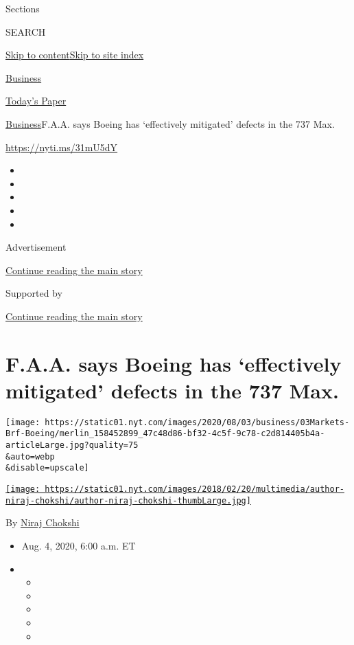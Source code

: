 Sections

SEARCH

\protect\hyperlink{site-content}{Skip to
content}\protect\hyperlink{site-index}{Skip to site index}

\href{https://www.nytimes.com/section/business}{Business}

\href{https://myaccount.nytimes.com/auth/login?response_type=cookie\&client_id=vi}{}

\href{https://www.nytimes.com/section/todayspaper}{Today's Paper}

\href{/section/business}{Business}\textbar{}F.A.A. says Boeing has
`effectively mitigated' defects in the 737 Max.

\url{https://nyti.ms/31mU5dY}

\begin{itemize}
\item
\item
\item
\item
\item
\end{itemize}

Advertisement

\protect\hyperlink{after-top}{Continue reading the main story}

Supported by

\protect\hyperlink{after-sponsor}{Continue reading the main story}

\hypertarget{faa-says-boeing-has-effectively-mitigated-defects-in-the-737-max}{%
\section{F.A.A. says Boeing has `effectively mitigated' defects in the
737
Max.}\label{faa-says-boeing-has-effectively-mitigated-defects-in-the-737-max}}

\texttt{[image: https://static01.nyt.com/images/2020/08/03/business/03Markets-Brf-Boeing/merlin\_158452899\_47c48d86-bf32-4c5f-9c78-c2d814405b4a-articleLarge.jpg?quality=75\\\&auto=webp\\\&disable=upscale]}

\href{https://www.nytimes.com/by/niraj-chokshi}{\texttt{[image: https://static01.nyt.com/images/2018/02/20/multimedia/author-niraj-chokshi/author-niraj-chokshi-thumbLarge.jpg]}}

By \href{https://www.nytimes.com/by/niraj-chokshi}{Niraj Chokshi}

\begin{itemize}
\item
  Aug. 4, 2020, 6:00 a.m. ET
\item
  \begin{itemize}
  \item
  \item
  \item
  \item
  \item
  \end{itemize}
\end{itemize}


